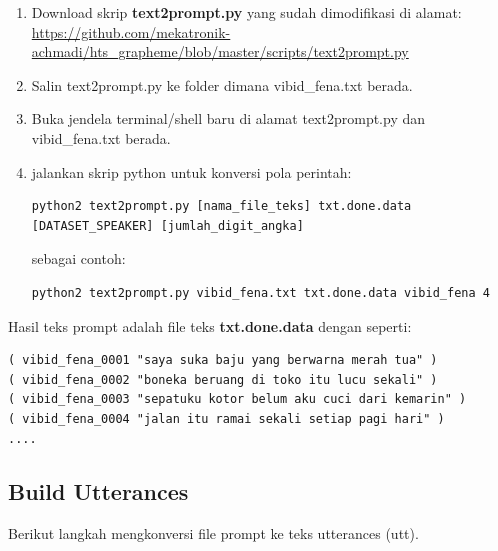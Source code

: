 \documentclass[12pt,]{article}
\begin{document}
	\begin{enumerate}
		\item Download skrip \textbf{text2prompt.py} yang sudah dimodifikasi di alamat: \\
		\url{https://github.com/mekatronik-achmadi/hts_grapheme/blob/master/scripts/text2prompt.py}
		
		\item Salin text2prompt.py ke folder dimana vibid\_fena.txt berada.
		
		\item Buka jendela terminal/shell baru di alamat text2prompt.py dan vibid\_fena.txt berada.
		
		\item jalankan skrip python untuk konversi
		pola perintah:
		\begin{verbatim}
python2 text2prompt.py [nama_file_teks] txt.done.data [DATASET_SPEAKER] [jumlah_digit_angka]
		\end{verbatim}
		
		sebagai contoh:
		\begin{verbatim}
python2 text2prompt.py vibid_fena.txt txt.done.data vibid_fena 4
		\end{verbatim}
		
	\end{enumerate}

	Hasil teks prompt adalah file teks \textbf{txt.done.data} dengan seperti:
	\begin{verbatim}
( vibid_fena_0001 "saya suka baju yang berwarna merah tua" )
( vibid_fena_0002 "boneka beruang di toko itu lucu sekali" )
( vibid_fena_0003 "sepatuku kotor belum aku cuci dari kemarin" )
( vibid_fena_0004 "jalan itu ramai sekali setiap pagi hari" )
....
	\end{verbatim}

	\subsection{Build Utterances}
	
	Berikut langkah mengkonversi file prompt ke teks utterances (utt).
	
\end{document}
